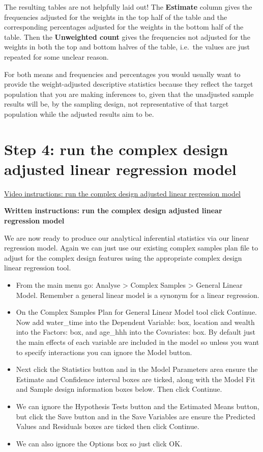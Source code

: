 \documentclass[
]{book}
\begin{document}
The resulting tables are not helpfully laid out! The \textbf{Estimate} column gives the frequencies adjusted for the weights in the top half of the table and the corresponding percentages adjusted for the weights in the bottom half of the table. Then the \textbf{Unweighted count} gives the frequencies not adjusted for the weights in both the top and bottom halves of the table, i.e.~the values are just repeated for some unclear reason.

For both means and frequencies and percentages you would usually want to provide the weight-adjusted descriptive statistics because they reflect the target population that you are making inferences to, given that the unadjusted sample results will be, by the sampling design, not representative of that target population while the adjusted results aim to be.

\hypertarget{step-4-run-the-complex-design-adjusted-linear-regression-model}{%
\section{Step 4: run the complex design adjusted linear regression model}\label{step-4-run-the-complex-design-adjusted-linear-regression-model}}

\href{https://youtu.be/SIgR57AbJwA}{Video instructions: run the complex design adjusted linear regression model}

\textbf{Written instructions: run the complex design adjusted linear regression model}

We are now ready to produce our analytical inferential statistics via our linear regression model. Again we can just use our existing complex samples plan file to adjust for the complex design features using the appropriate complex design linear regression tool.

\begin{itemize}
\item
  From the main menu go: Analyse \textgreater{} Complex Samples \textgreater{} General Linear Model. Remember a general linear model is a synonym for a linear regression.
\item
  On the Complex Samples Plan for General Linear Model tool click Continue. Now add water\_time into the Dependent Variable: box, location and wealth into the Factors: box, and age\_hhh into the Covariates: box. By default just the main effects of each variable are included in the model so unless you want to specify interactions you can ignore the Model button.
\item
  Next click the Statistics button and in the Model Parameters area ensure the Estimate and Confidence interval boxes are ticked, along with the Model Fit and Sample design information boxes below. Then click Continue.
\item
  We can ignore the Hypothesis Tests button and the Estimated Means button, but click the Save button and in the Save Variables are ensure the Predicted Values and Residuals boxes are ticked then click Continue.
\item
  We can also ignore the Options box so just click OK.
\end{itemize}
\end{document}
